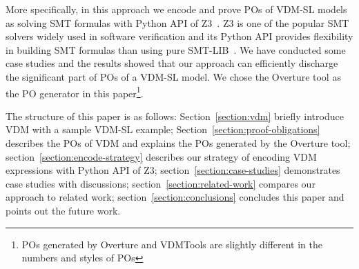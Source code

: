 More specifically, in this approach we encode and prove POs of VDM-SL models as solving SMT formulas with Python API of Z3~\cite{MB:08:ZSS}. Z3 is one of the popular SMT solvers widely used in software verification and its Python API provides flexibility in building SMT formulas than using pure SMT-LIB~\cite{BarFT-SMTLIB}. We have conducted some case studies and the results showed that our approach can efficiently discharge the significant part of POs of a VDM-SL model. We chose the Overture tool as the PO generator in this paper\footnote{POs generated by Overture and VDMTools are slightly different in the numbers and styles of POs}.

The structure of this paper is as follows: Section~\ref{section:vdm} briefly introduce VDM with a sample VDM-SL example; Section~\ref{section:proof-obligations} describes the POs of VDM and explains the POs generated by the Overture tool; section~\ref{section:encode-strategy} describes our strategy of encoding VDM expressions with Python API of Z3; section~\ref{section:case-studies} demonstrates case studies with discussions; section~\ref{section:related-work} compares our approach to related work; section~\ref{section:conclusions} concludes this paper and points out the future work.

